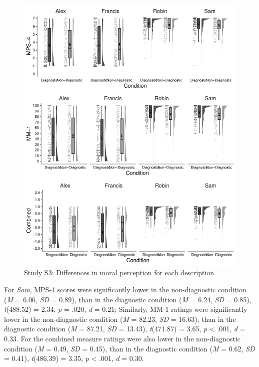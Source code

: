 \documentclass[
  man,floatsintext]{apa6}
\begin{document}
\begin{figure}[!h]
\includegraphics[width=\textwidth,]{Supplementary_files/figure-latex/StudyS3allscenariosPlot-1} \caption{Study S3: Differences in moral perception for each description}\label{fig:StudyS3allscenariosPlot}
\end{figure}

For \emph{Sam}, MPS-4 scores were significantly lower in the non-diagnostic condition (\emph{M} = 6.06, \emph{SD} = 0.89), than in the diagnostic condition (\emph{M} = 6.24, \emph{SD} = 0.85), \emph{t}(488.52) = 2.34, \emph{p} = .020, \emph{d} = 0.21; Similarly, MM-1 ratings were significantly lower in the non-diagnostic condition (\emph{M} = 82.23, \emph{SD} = 16.63), than in the diagnostic condition (\emph{M} = 87.21, \emph{SD} = 13.43), \emph{t}(471.87) = 3.65, \emph{p} \textless{} .001, \emph{d} = 0.33. For the combined measure ratings were also lower in the non-diagnostic condition (\emph{M} = 0.49, \emph{SD} = 0.45), than in the diagnostic condition (\emph{M} = 0.62, \emph{SD} = 0.41), \emph{t}(486.39) = 3.35, \emph{p} \textless{} .001, \emph{d} = 0.30.
\end{document}

